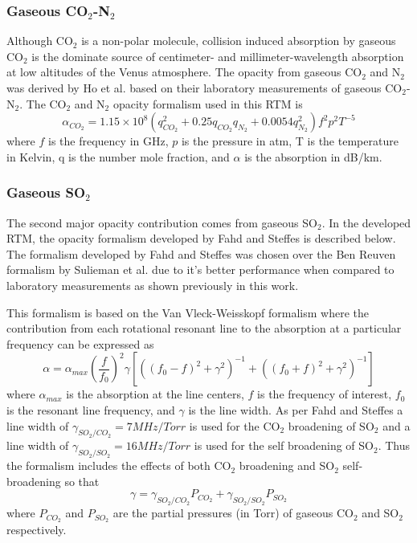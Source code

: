 \subsubsection{Gaseous CO$_2$-N$_2$}
Although CO$_2$ is a non-polar molecule, collision induced absorption by gaseous CO$_2$ \cite{Barrett-1960} is the dominate source of centimeter- and millimeter-wavelength absorption at low altitudes of the Venus atmosphere. The opacity from gaseous CO$_2$ and N$_2$  was derived by Ho et al. \cite{Ho-1966} based on their laboratory measurements of gaseous CO$_2$-N$_2$. The CO$_2$ and N$_2$ opacity formalism used in this RTM is
\begin{equation}\label{eq:rtm-co2n2}
\alpha_{CO_2} = 1.15\times 10^8(q_{CO_2}^2 + 0.25q_{CO_2}q_{N_2} + 0.0054q_{N_2}^2)f^2p^2T^{-5}
\end{equation}
where $f$ is the frequency in GHz, $p$ is the pressure in atm, T is the temperature in Kelvin, q is the number mole fraction, and $\alpha$ is the absorption in dB/km.

\subsubsection{Gaseous SO$_2$}
The second major opacity contribution comes from gaseous SO$_2$. In the developed RTM, the opacity formalism developed by Fahd and Steffes \cite{Fahd-1991} is described below. The formalism developed by Fahd and Steffes was chosen over the Ben Reuven formalism by Sulieman et al. \cite{Suleiman-1996} due to it's better performance when compared to laboratory measurements as shown previously in this work.

This formalism is based on the Van Vleck-Weisskopf formalism where the contribution from each rotational resonant line to the absorption at a particular frequency can be expressed as 
\begin{equation}
\label{eq:rtm-so2fahd}
\alpha = \alpha_{max} \left(\frac{f}{f_0}\right)^2 \gamma [((f_0-f)^2+\gamma^2)^{-1}+((f_0+f)^2 + \gamma^2)^{-1}]
\end{equation}
where $\alpha_{max}$ is the absorption at the line centers, $f$ is the frequency of interest, $f_0$ is the resonant line frequency, and $\gamma$ is the line width. As per Fahd and Steffes \cite{Fahd-1991} a line width of $\gamma_{SO_2/CO_2} = 7MHz/Torr$ is used for the CO$_2$ broadening of SO$_2$ and a line width of $\gamma_{SO_2/SO_2} = 16MHz/Torr$ is used for the self broadening of SO$_2$. Thus the formalism includes the effects of both CO$_2$ broadening and SO$_2$ self-broadening so that
\begin{equation}
\gamma = \gamma_{SO_2/CO_2}P_{CO_2} + \gamma_{SO_2/SO_2}P_{SO_2}
\end{equation}
where $P_{CO_2}$ and $P_{SO_2}$ are the partial pressures (in Torr) of gaseous CO$_2$ and SO$_2$ respectively.

